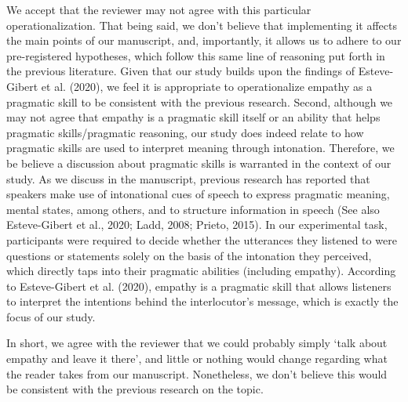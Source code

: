 \documentclass[]{article}
\newcommand{\TaskEstimationBox}[2]{%
\ifoptiondraft{\parbox{1.0\linewidth}{\hfill \hfill {\colorbox{#2}{\color{White} \textbf{#1}}}}}%
{}%
}
\def\Done {\TaskEstimationBox{Done}{Blue}}
\def\Easy {\TaskEstimationBox{Feasible}{ForestGreen}}
\begin{document}
We accept that the reviewer may not agree with this particular operationalization.
That being said, we don't believe that implementing it affects the main points of our manuscript, and, importantly, it allows us to adhere to our pre-registered hypotheses, which follow this same line of reasoning put forth in the previous literature.
Given that our study builds upon the findings of Esteve-Gibert et al. (2020), we feel it is appropriate to operationalize empathy as a pragmatic skill to be consistent with the previous research.
Second, although we may not agree that empathy is a pragmatic skill itself or an ability that helps pragmatic skills/pragmatic reasoning, our study does indeed relate to how pragmatic skills are used to interpret meaning through intonation.
Therefore, we be believe a discussion about pragmatic skills is warranted in the context of our study.
As we discuss in the manuscript, previous research has reported that speakers make use of intonational cues of speech to express pragmatic meaning, mental states, among others, and to structure information in speech (See also Esteve-Gibert et al., 2020; Ladd, 2008; Prieto, 2015).
In our experimental task, participants were required to decide whether the utterances they listened to were questions or statements solely on the basis of the intonation they perceived, which directly taps into their pragmatic abilities (including empathy).
According to Esteve-Gibert et al. (2020), empathy is a pragmatic skill that allows listeners to interpret the intentions behind the interlocutor's message, which is exactly the focus of our study.

In short, we agree with the reviewer that we could probably simply `talk about empathy and leave it there', and little or nothing would change regarding what the reader takes from our manuscript.
Nonetheless, we don't believe this would be consistent with the previous research on the topic.

\Done
\Easy

\end{document}
